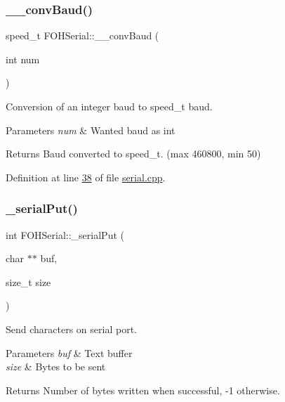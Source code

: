 \subsubsection{\texorpdfstring{\+\_\+\+\_\+conv\+Baud()}{\_\_convBaud()}}
{\footnotesize\ttfamily speed\+\_\+t F\+O\+H\+Serial\+::\+\_\+\+\_\+conv\+Baud (\begin{DoxyParamCaption}\item[{int}]{num }\end{DoxyParamCaption})\hspace{0.3cm}{\ttfamily [private]}}



Conversion of an integer baud to speed\+\_\+t baud. 


\begin{DoxyParams}{Parameters}
{\em num} & Wanted baud as int\\
\hline
\end{DoxyParams}
\begin{DoxyReturn}{Returns}
Baud converted to speed\+\_\+t. (max 460800, min 50) 
\end{DoxyReturn}


Definition at line \mbox{\hyperlink{serial_8cpp_source_l00038}{38}} of file \mbox{\hyperlink{serial_8cpp_source}{serial.\+cpp}}.

\mbox{\label{classFOHSerial_add9b2e556b56459b2eddc9b71f5c80ed}} 
\subsubsection{\texorpdfstring{\+\_\+serial\+Put()}{\_serialPut()}}
{\footnotesize\ttfamily int F\+O\+H\+Serial\+::\+\_\+serial\+Put (\begin{DoxyParamCaption}\item[{char $\ast$$\ast$}]{buf,  }\item[{size\+\_\+t}]{size }\end{DoxyParamCaption})\hspace{0.3cm}{\ttfamily [private]}}



Send characters on serial port. 


\begin{DoxyParams}{Parameters}
{\em buf} & Text buffer \\
\hline
{\em size} & Bytes to be sent\\
\hline
\end{DoxyParams}
\begin{DoxyReturn}{Returns}
Number of bytes written when successful, -\/1 otherwise. 
\end{DoxyReturn}


